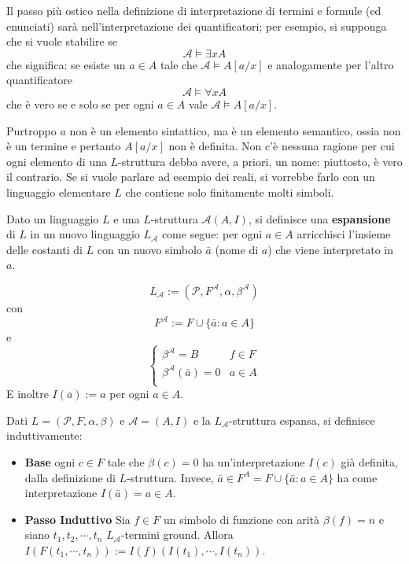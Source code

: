 Il passo più ostico nella definizione di interpretazione di termini 
e formule (ed enunciati) sarà nell'interpretazione dei quantificatori; 
per esempio, si supponga che si vuole stabilire se 
$$
\mathcal{A} \models \exists x A
$$
che significa: se esiste un $a \in A$ tale che $\mathcal{A} \models A[a/x]$
e  analogamente per l'altro quantificatore 
$$
\mathcal{A} \models \forall x A
$$
che è vero se e solo se per ogni $a \in A$ vale $\mathcal{A} \models A[a/x]$. 

Purtroppo $a$ non è un elemento sintattico, ma è un elemento semantico, 
ossia non è un termine e pertanto $A[a/x]$ non è definita.
Non c'è nessuna ragione per cui ogni elemento di una $L$-struttura 
debba avere, a priori, un nome: piuttosto, è vero il contrario. Se si vuole 
parlare ad esempio dei reali, si vorrebbe farlo con un linguaggio 
elementare $L$ che contiene solo finitamente molti simboli. 

\begin{defi}
        Dato un linguaggio $L$ e una $L$-struttura $\mathcal{A}(A,I)$, si definisce 
        una \textbf{espansione} di $L$ in un nuovo linguaggio $L_{\mathcal{A}}$
        come segue: 
        per ogni $a \in A$ arricchisci l'insieme delle costanti di $L$ con un 
        nuovo simbolo $\bar{a}$ (nome di $a$) che viene interpretato in $a$. 

        $$
        L_{\mathcal{A}} := (\mathcal{P}, F^{\mathcal{A}}, \alpha, \beta^{\mathcal{A}})
        $$
        con
        $$
        F^{\mathcal{A}} := F\cup \{\bar{a}: a \in A\}
        $$
        e 
        $$
        \begin{cases}
                \beta^{\mathcal{A}} = B & f \in F\\
                \beta^{\mathcal{A}}(\bar{a}) = 0 & a \in A\\
        \end{cases}
        $$
        E inoltre $I(\bar{a}) := a $ per ogni $a \in A$. 
\end{defi}

\begin{defi}
        Dati $L = (\mathcal{P}, F, \alpha, \beta)$ e $\mathcal{A} = (A,I)$ 
        e la $L_{\mathcal{A}}$-struttura espansa, si definisce induttivamente: 
        \begin{itemize}
                \item{\textbf{Base}} ogni $c \in F$ tale che $\beta(c) = 0$ ha un'interpretazione $I(c)$
                        già definita, dalla definizione di $L$-struttura. Invece, 
                        $\bar{a} \in F^{A} = F \cup \{\bar{a} : a \in A\}$ 
                        ha come interpretazione $I(\bar{a}) = a \in A$. 
                \item{\textbf{Passo Induttivo}}
                        Sia $f \in F$ un simbolo di funzione con arità $\beta(f) = n$ e 
                        siano $t_1, t_2, \cdots, t_n$ $L_{\mathcal{A}}$-termini ground. 
                        Allora $I(F(t_1, \cdots, t_n)):= I(f)(I(t_1), \cdots, I(t_n))$. 
        \end{itemize}
\end{defi}

